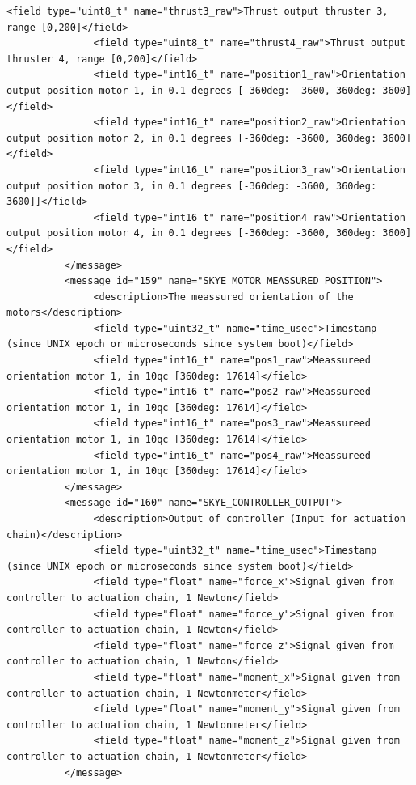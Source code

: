 \begin{lstlisting}[captionpos=b, caption="Definition of \textsc{Skye} specific Mavlink messages", label=app_xml]
               <field type="uint8_t" name="thrust3_raw">Thrust output thruster 3, range [0,200]</field>
               <field type="uint8_t" name="thrust4_raw">Thrust output thruster 4, range [0,200]</field>
               <field type="int16_t" name="position1_raw">Orientation output position motor 1, in 0.1 degrees [-360deg: -3600, 360deg: 3600]</field>
               <field type="int16_t" name="position2_raw">Orientation output position motor 2, in 0.1 degrees [-360deg: -3600, 360deg: 3600]</field>
               <field type="int16_t" name="position3_raw">Orientation output position motor 3, in 0.1 degrees [-360deg: -3600, 360deg: 3600]]</field>
               <field type="int16_t" name="position4_raw">Orientation output position motor 4, in 0.1 degrees [-360deg: -3600, 360deg: 3600]</field>
          </message>
          <message id="159" name="SKYE_MOTOR_MEASSURED_POSITION">
               <description>The meassured orientation of the motors</description>
               <field type="uint32_t" name="time_usec">Timestamp (since UNIX epoch or microseconds since system boot)</field>
               <field type="int16_t" name="pos1_raw">Meassureed orientation motor 1, in 10qc [360deg: 17614]</field>
               <field type="int16_t" name="pos2_raw">Meassureed orientation motor 1, in 10qc [360deg: 17614]</field>
               <field type="int16_t" name="pos3_raw">Meassureed orientation motor 1, in 10qc [360deg: 17614]</field>
               <field type="int16_t" name="pos4_raw">Meassureed orientation motor 1, in 10qc [360deg: 17614]</field>
          </message>
          <message id="160" name="SKYE_CONTROLLER_OUTPUT">
               <description>Output of controller (Input for actuation chain)</description>
               <field type="uint32_t" name="time_usec">Timestamp (since UNIX epoch or microseconds since system boot)</field>
               <field type="float" name="force_x">Signal given from controller to actuation chain, 1 Newton</field>
               <field type="float" name="force_y">Signal given from controller to actuation chain, 1 Newton</field>
               <field type="float" name="force_z">Signal given from controller to actuation chain, 1 Newton</field>
               <field type="float" name="moment_x">Signal given from controller to actuation chain, 1 Newtonmeter</field>
               <field type="float" name="moment_y">Signal given from controller to actuation chain, 1 Newtonmeter</field>
               <field type="float" name="moment_z">Signal given from controller to actuation chain, 1 Newtonmeter</field>
          </message>

\end{lstlisting}

